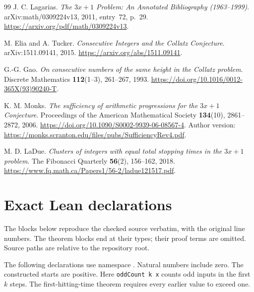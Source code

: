 \documentclass[11pt,a4paper]{article}
\newcommand{\code}[1]{\texttt{#1}}
\begin{document}
\begin{thebibliography}{99}
 J. C. Lagarias.
\emph{The $3x+1$ Problem: An Annotated Bibliography (1963--1999)}.
arXiv:math/0309224v13, 2011, entry~72, p.~29.
\url{https://arxiv.org/pdf/math/0309224v13}.

 M. Elia and A. Tucker.
\emph{Consecutive Integers and the Collatz Conjecture}.
arXiv:1511.09141, 2015.
\url{https://arxiv.org/abs/1511.09141}.

 G.-G. Gao.
\emph{On consecutive numbers of the same height in the Collatz problem}.
Discrete Mathematics \textbf{112}(1--3), 261--267, 1993.
\url{https://doi.org/10.1016/0012-365X(93)90240-T}.

 K. M. Monks.
\emph{The sufficiency of arithmetic progressions for the $3x+1$ Conjecture}.
Proceedings of the American Mathematical Society \textbf{134}(10),
2861--2872, 2006.
\url{https://doi.org/10.1090/S0002-9939-06-08567-4}.
Author version:
\url{https://monks.scranton.edu/files/pubs/SufficiencyRev4.pdf}.

 M. D. LaDue.
\emph{Clusters of integers with equal total stopping times in the $3x+1$ problem}.
The Fibonacci Quarterly \textbf{56}(2), 156--162, 2018.
\url{https://www.fq.math.ca/Papers1/56-2/ladue121517.pdf}.

\end{thebibliography}
\clearpage
\appendix
\section{Exact Lean declarations}
\label{app:lean-statements}
The blocks below reproduce the checked source verbatim, with the original
line numbers. The theorem blocks end at their types; their proof terms are
omitted. Source paths are relative to the repository root.

The following declarations use namespace
.
Natural numbers include zero. The constructed starts are positive.
Here \code{oddCount k x} counts odd inputs in the first $k$ steps.
The first-hitting-time theorem requires every earlier value to
exceed one.
\end{document}
